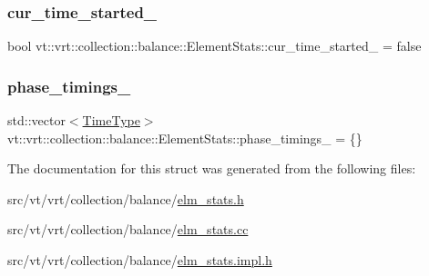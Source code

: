 \subsubsection{\texorpdfstring{cur\+\_\+time\+\_\+started\+\_\+}{cur\_time\_started\_}}
{\footnotesize\ttfamily bool vt\+::vrt\+::collection\+::balance\+::\+Element\+Stats\+::cur\+\_\+time\+\_\+started\+\_\+ = false\hspace{0.3cm}{\ttfamily [protected]}}

\mbox{\label{structvt_1_1vrt_1_1collection_1_1balance_1_1_element_stats_ac3df7cd0b637aef1e0faa92bb0193542}} 
\subsubsection{\texorpdfstring{phase\+\_\+timings\+\_\+}{phase\_timings\_}}
{\footnotesize\ttfamily std\+::vector$<$\hyperlink{namespacevt_a876a9d0cd5a952859c72de8a46881442}{Time\+Type}$>$ vt\+::vrt\+::collection\+::balance\+::\+Element\+Stats\+::phase\+\_\+timings\+\_\+ = \{\}\hspace{0.3cm}{\ttfamily [protected]}}



The documentation for this struct was generated from the following files\+:\begin{DoxyCompactItemize}
\item 
src/vt/vrt/collection/balance/\hyperlink{elm__stats_8h}{elm\+\_\+stats.\+h}\item 
src/vt/vrt/collection/balance/\hyperlink{elm__stats_8cc}{elm\+\_\+stats.\+cc}\item 
src/vt/vrt/collection/balance/\hyperlink{elm__stats_8impl_8h}{elm\+\_\+stats.\+impl.\+h}\end{DoxyCompactItemize}
